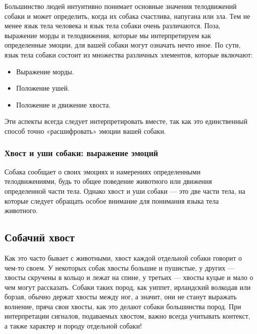 
Большинство людей интуитивно понимает основные значения телодвижений собаки и может определить, когда их собака счастлива, напугана или зла. Тем не менее язык тела человека и язык тела собаки очень различаются. Поза, выражение морды и телодвижения, которые мы интерпретируем как определенные эмоции, для вашей собаки могут означать нечто иное. По сути, язык тела собаки состоит из множества различных элементов, которые включают:

\begin{itemize}
    \item Выражение морды.
    \item Положение ушей.
    \item Положение и движение хвоста.
\end{itemize}

Эти аспекты всегда следует интерпретировать вместе, так как это единственный способ точно «расшифровать» эмоции вашей собаки.


\subsubsection{Хвост и уши собаки: выражение эмоций}

Собака сообщает о своих эмоциях и намерениях определенными телодвижениями, будь то общее поведение животного или движения определенной части тела. Однако хвост и уши собаки — это две части тела, на которые следует обращать особое внимание для понимания языка тела животного.\cite{DogSignals}

\subsection{Собачий хвост}

Как это часто бывает с животными, хвост каждой отдельной собаки говорит о чем-то своем. У некоторых собак хвосты большие и пушистые, у других — хвосты скручены в кольцо и лежат на спине, у третьих — хвосты куцые и мало о чем могут рассказать. Собаки таких пород, как уиппет, ирландский волкодав или борзая, обычно держат хвосты между ног, а значит, они не станут выражать волнение, пряча свои хвосты, как это делают собаки большинства пород. При интерпретации сигналов, подаваемых хвостом, важно всегда учитывать контекст, а также характер и породу отдельной собаки!

